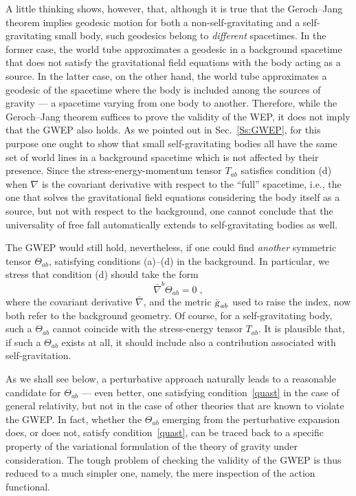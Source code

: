 \documentclass[a4paper,showkeys,aps,prd,reprint,nofootinbib,showpacs,twocolumn]{revtex4-1}
\newcommand{\eq}[1]{\( #1 \)}
\newcommand{\eqd}[1]{\begin{equation} #1 \end{equation}}
\newcommand{\matg}{\text{\textsl{g}}}%
\theoremstyle{plain}
\begin{document}
A little thinking shows, however, that, although it is true that the Geroch--Jang theorem implies geodesic motion for both a non-self-gravitating and a self-gravitating small body, such geodesics belong to \emph{different} spacetimes.  In the former case, the world tube approximates a geodesic in a background spacetime that does not satisfy the gravitational field equations with the body acting as a source.  In the latter case, on the other hand, the world tube approximates a geodesic of the spacetime where the body is included among the sources of gravity --- a spacetime varying from one body to another.  Therefore, while the Geroch--Jang theorem suffices to prove the validity of the WEP, it does not imply that the GWEP also holds.  As we pointed out in Sec.~\ref{Ss:GWEP}, for this purpose one ought to show that small self-gravitating bodies all have the same set of world lines in a background spacetime which is not affected by their presence.  Since the stress-energy-momentum tensor \eq{T_{ab}} satisfies condition (d) when \eq{\nabla} is the covariant derivative with respect to the ``full'' spacetime, i.e., the one that solves the gravitational field equations considering the body itself as a source, but not with respect to the background, one cannot conclude that the universality of free fall automatically extends to self-gravitating bodies as well.

The GWEP would still hold, nevertheless, if one could find \emph{another} symmetric tensor \eq{\Theta_{ab}}, satisfying conditions (a)--(d) in the background.  In particular, we stress that condition (d) should take the form
%
\eqd{\bar{\nabla}^b \Theta_{ab}=0\;, \label{quast}}
%
where the covariant derivative \eq{\bar{\nabla}}, and the metric \eq{\bar{\matg}_{ab}} used to raise the index, now both refer to the background geometry.  Of course, for a self-gravitating body, such a \eq{\Theta_{ab}} cannot coincide with the stress-energy tensor \eq{T_{ab}}.  It is plausible that, if such a \eq{\Theta_{ab}} exists at all, it should include also a contribution associated with self-gravitation.

As we shall see below, a perturbative approach naturally leads to a reasonable candidate for \eq{\Theta_{ab}} --- even better, one satisfying condition~\eqref{quast} in the case of general relativity, but not in the case of other theories that are known to violate the GWEP.  In fact, whether the \eq{\Theta_{ab}} emerging from the perturbative expansion does, or does not, satisfy condition~\eqref{quast}, can be traced back to a specific property of the variational formulation of the  theory of gravity under consideration.  The tough problem of checking the validity of the GWEP is thus reduced to a much simpler one, namely, the mere inspection of the action functional.
\end{document}
